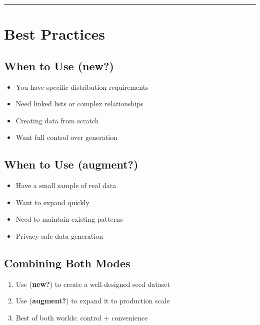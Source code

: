 \documentclass[
  letterpaper,
]{scrbook}
\providecommand{\tightlist}{%
  \setlength{\itemsep}{0pt}\setlength{\parskip}{0pt}}
\begin{document}
\begin{center}\rule{0.5\linewidth}{0.5pt}\end{center}

\section{Best Practices}\label{best-practices-5}

\subsection{\texorpdfstring{When to Use
(\textbf{new?})}{When to Use (new?)}}\label{when-to-use-new}

\begin{itemize}
\tightlist
\item
  You have specific distribution requirements
\item
  Need linked lists or complex relationships
\item
  Creating data from scratch
\item
  Want full control over generation
\end{itemize}

\subsection{\texorpdfstring{When to Use
(\textbf{augment?})}{When to Use (augment?)}}\label{when-to-use-augment}

\begin{itemize}
\tightlist
\item
  Have a small sample of real data
\item
  Want to expand quickly
\item
  Need to maintain existing patterns
\item
  Privacy-safe data generation
\end{itemize}

\subsection{Combining Both Modes}\label{combining-both-modes}

\begin{enumerate}
\def\labelenumi{\arabic{enumi}.}
\tightlist
\item
  Use (\textbf{new?}) to create a well-designed seed dataset
\item
  Use (\textbf{augment?}) to expand it to production scale
\item
  Best of both worlds: control + convenience
\end{enumerate}
\end{document}
